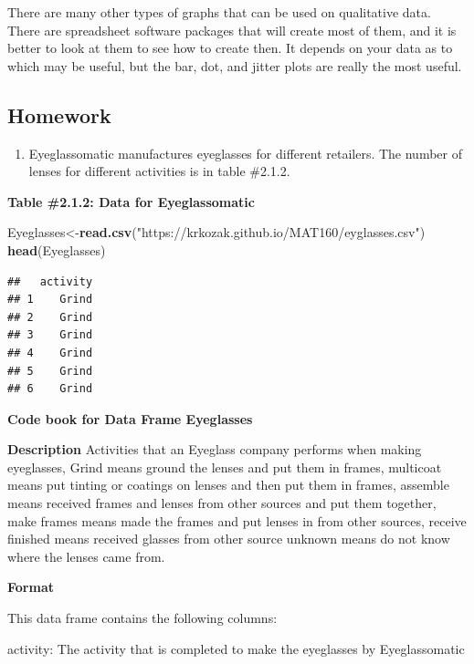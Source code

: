 \documentclass[
]{book}
\newenvironment{Shaded}{\begin{snugshade}}{\end{snugshade}}
\newcommand{\KeywordTok}[1]{\textcolor[rgb]{0.13,0.29,0.53}{\textbf{#1}}}
\newcommand{\NormalTok}[1]{#1}
\newcommand{\StringTok}[1]{\textcolor[rgb]{0.31,0.60,0.02}{#1}}
\providecommand{\tightlist}{%
  \setlength{\itemsep}{0pt}\setlength{\parskip}{0pt}}
\begin{document}
There are many other types of graphs that can be used on qualitative data. There are spreadsheet software packages that will create most of them, and it is better to look at them to see how to create then. It depends on your data as to which may be useful, but the bar, dot, and jitter plots are really the most useful.

\hypertarget{homework}{%
\subsection{Homework}\label{homework}}

\begin{enumerate}
\def\labelenumi{\arabic{enumi}.}
\tightlist
\item
  Eyeglassomatic manufactures eyeglasses for different retailers. The number of lenses for different activities is in table \#2.1.2.
\end{enumerate}

\textbf{Table \#2.1.2: Data for Eyeglassomatic}

\begin{Shaded}
\begin{Highlighting}[]
\NormalTok{Eyeglasses<-}\KeywordTok{read.csv}\NormalTok{(}\StringTok{"https://krkozak.github.io/MAT160/eyglasses.csv"}\NormalTok{)}
\KeywordTok{head}\NormalTok{(Eyeglasses)}
\end{Highlighting}
\end{Shaded}

\begin{verbatim}
##   activity
## 1    Grind
## 2    Grind
## 3    Grind
## 4    Grind
## 5    Grind
## 6    Grind
\end{verbatim}

\textbf{Code book for Data Frame Eyeglasses}

\textbf{Description}
Activities that an Eyeglass company performs when making eyeglasses, Grind means ground the lenses and put them in frames, multicoat means put tinting or coatings on lenses and then put them in frames, assemble means received frames and lenses from other sources and put them together, make frames means made the frames and put lenses in from other sources, receive finished means received glasses from other source unknown means do not know where the lenses came from.

\textbf{Format}

This data frame contains the following columns:

activity: The activity that is completed to make the eyeglasses by Eyeglassomatic
\end{document}
